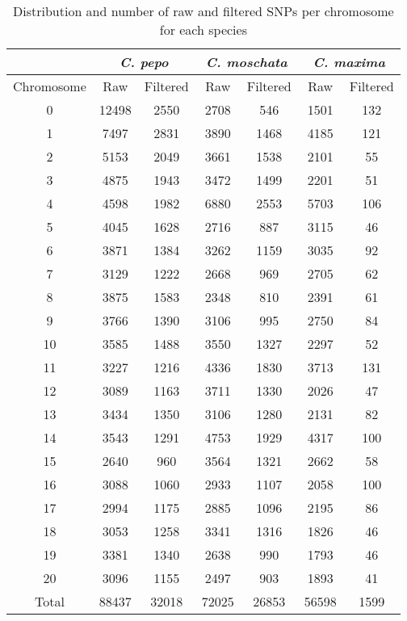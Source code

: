 \documentclass[utf8]{FrontiersinHarvard} %
\begin{document}
\begin{table}[h]
\begin{tabular}{c c c c c c c}
	\hline
	& \multicolumn{2}{c}{\textit{C. pepo}} & \multicolumn{2}{c}{\textit{C. moschata}}& \multicolumn{2}{c}{\textit{C. maxima}} \\
	\hline
	Chromosome & Raw & Filtered & Raw & Filtered & Raw & Filtered \\
	\hline
	0 & 12498 & 2550 & 2708 & 546 & 1501 & 132 \\
	1 & 7497 & 2831 & 3890 & 1468 & 4185 & 121 \\
	2 & 5153 & 2049 & 3661 & 1538 & 2101 & 55 \\
	3 & 4875 & 1943 & 3472 & 1499 & 2201 & 51 \\
	4 & 4598 & 1982 & 6880 & 2553 & 5703 & 106 \\
	5 & 4045 & 1628 & 2716 & 887 & 3115 & 46 \\
	6 & 3871 & 1384 & 3262 & 1159 & 3035 & 92 \\
	7 & 3129 & 1222 & 2668 & 969 & 2705 & 62 \\
	8 & 3875 & 1583 & 2348 & 810 & 2391 & 61 \\
	9 & 3766 & 1390 & 3106 & 995 & 2750 & 84 \\
	10 & 3585 & 1488 & 3550 & 1327 & 2297 & 52 \\
	11 & 3227 & 1216 & 4336 & 1830 & 3713 & 131 \\
	12 & 3089 & 1163 & 3711 & 1330 & 2026 & 47 \\
	13 & 3434 & 1350 & 3106 & 1280 & 2131 & 82 \\
	14 & 3543 & 1291 & 4753 & 1929 & 4317 & 100 \\
	15 & 2640 & 960 & 3564 & 1321 & 2662 & 58 \\
	16 & 3088 & 1060 & 2933 & 1107 & 2058 & 100 \\
	17 & 2994 & 1175 & 2885 & 1096 & 2195 & 86 \\
	18 & 3053 & 1258 & 3341 & 1316 & 1826 & 46 \\
	19 & 3381 & 1340 & 2638 & 990 & 1793 & 46 \\
	20 & 3096 & 1155 & 2497 & 903 & 1893 & 41 \\
	\hline
	Total & 88437 & 32018 & 72025 & 26853 & 56598 & 1599 \\
	\hline
\end{tabular}
	\caption{Distribution and number of raw and filtered SNPs per chromosome for each species \label{tbl:1}}
\end{table}
\end{document}
